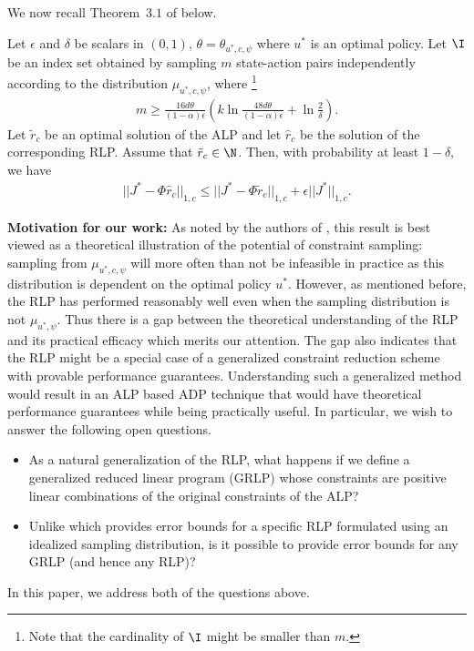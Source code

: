 We now recall Theorem~$3.1$ of \cite{CS} below. 
\begin{theorem}\label{csresult}
Let $\epsilon$ and $\delta$ be scalars in $(0,1)$,
$\theta = \theta_{u^*,c,\psi}$ where $u^*$ is an optimal policy.
Let $\I$ be an index set obtained by sampling $m$ state-action pairs 
	independently according to the distribution $\mu_{u^*,c,\psi}$,
	where%
	\footnote{Note that the cardinality of $\I$ might be smaller than $m$.}
\begin{align}
m\geq \frac{16d\theta}{(1-\alpha)\epsilon}\left(k\ln\frac{48d\theta}{(1-\alpha)\epsilon}+\ln\frac{2}{\delta}\right).
\end{align}
Let $\tilde{r}_c$ be an optimal	solution of the ALP and let $\hat{r}_c$ be the solution of the corresponding RLP. 
Assume that $\tilde{r}_c\in \N$.
Then, with probability at least $1-\delta$, we have
\begin{align}
||J^*-\Phi \hat{r}_c||_{1,c}\leq ||J^*-\Phi \tilde{r}_c||_{1,c}+\epsilon||J^*||_{1,c}.
\end{align}
\end{theorem}
\noindent \textbf{Motivation for our work:}
As noted by the authors of \cite{CS}, this result is best viewed as a
	theoretical illustration of the potential of constraint sampling:
	sampling from $\mu_{u^*,c,\psi}$ will more often than not be infeasible in practice
	as this distribution is dependent on the optimal policy $u^*$.
However, as mentioned before, the RLP has performed reasonably well 
	even when the sampling distribution is not $\mu_{u^*,\psi}$. 
Thus there is a gap between the theoretical understanding of the RLP 
	and its practical efficacy which merits our attention. 
The gap also indicates that the RLP might be a special case 
	of a generalized constraint reduction scheme with provable performance guarantees. 
Understanding such a generalized method would result in an ALP based ADP technique 
	that would have theoretical performance guarantees while being practically useful. 
In particular, we wish to answer the following open questions.
\begin{itemize}
\item  As a natural generalization of the RLP, what happens if we define a generalized reduced linear program (GRLP) whose constraints are positive linear combinations of the original constraints of the ALP?
\item Unlike \cite{CS} which provides error bounds for a specific RLP formulated using an idealized sampling distribution, is it possible to provide error bounds for any GRLP (and hence any RLP)?
\end{itemize}
In this paper, we address both of the questions above.
